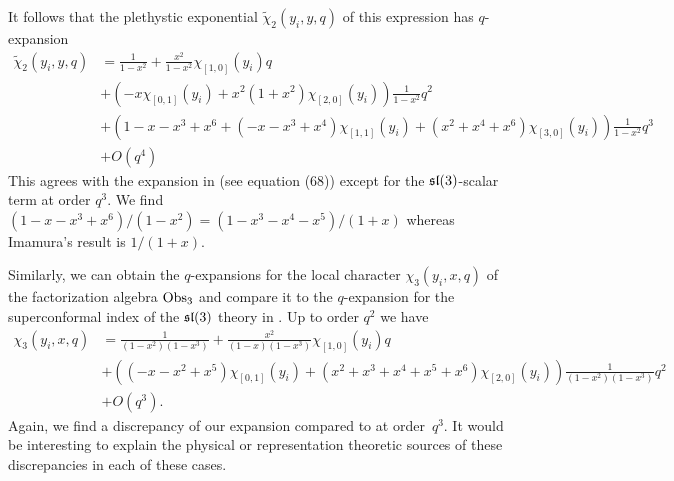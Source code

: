 It follows that the plethystic exponential $\tilde \chi_2(y_i,y,q)$ of this expression has $q$-expansion
\begin{align*}
\tilde \chi_2(y_i,y,q) & = \frac{1}{1-x^2} +  \frac{x^2}{1-x^2} \chi_{[1,0]}(y_i) q \\
& + \left(- x \chi_{[0,1]}(y_i) +  x^2 (1+x^2)\chi_{[2,0]}(y_i)\right) \frac{1}{1-x^2} q^2 \\ 
& + \left( 1 - x - x^3 + x^6 + (-x - x^3 + x^4) \chi_{[1,1]}(y_i)  + (x^2 + x^4 + x^6)\chi_{[3,0]}(y_i)  \right) \frac{1}{1-x^2} q^3 \\
& + O(q^4) 
\end{align*}
This agrees with the expansion in \cite{Imamura} (see equation (68)) except for the $\mathfrak{sl}(3)$-scalar term at order $q^3$. 
We find $(1-x-x^3+x^6) / (1-x^2) = (1-x^3-x^4-x^5) / (1+x)$ whereas Imamura's result is $1 / (1+x)$. 

Similarly, we can obtain the $q$-expansions for the local character $\chi_3(y_i,x,q)$ of the factorization algebra $\text{Obs}_3$ and compare it to the $q$-expansion for the superconformal index of the $\mathfrak{sl}(3)$ theory in \cite{Imamura}. 
Up to order $q^2$ we have
\begin{align*}
\chi_3(y_i,x,q) & = \frac{1}{(1-x^2)(1-x^3)} + \frac{x^2}{(1-x)(1-x^3)} \chi_{[1,0]}(y_i) q \\
& + \left((-x -x^2 + x^5)\chi_{[0,1]}(y_i) + (x^2 + x^3 + x^4 + x^5+ x^6) \chi_{[2,0]}(y_i) \right) \frac{1}{(1-x^2)(1-x^3)} q^2 \\
& + O(q^3) .
\end{align*}
Again, we find a discrepancy of our expansion compared to \cite{Imamura} at order~$q^3$.
It would be interesting to explain the physical or representation theoretic sources of these discrepancies in each of these cases.
\fi


